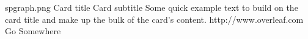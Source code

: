 \documentclass[12pt,a4paper]{article}
\begin{document}
\begin{card}
    {spgraph.png} %
    {Card title}
    {Card subtitle}
    {Some quick example text to build on the card title and make up the bulk of the card's content.}
    {http://www.overleaf.com}
    {Go Somewhere}
\end{card}
\end{document}
